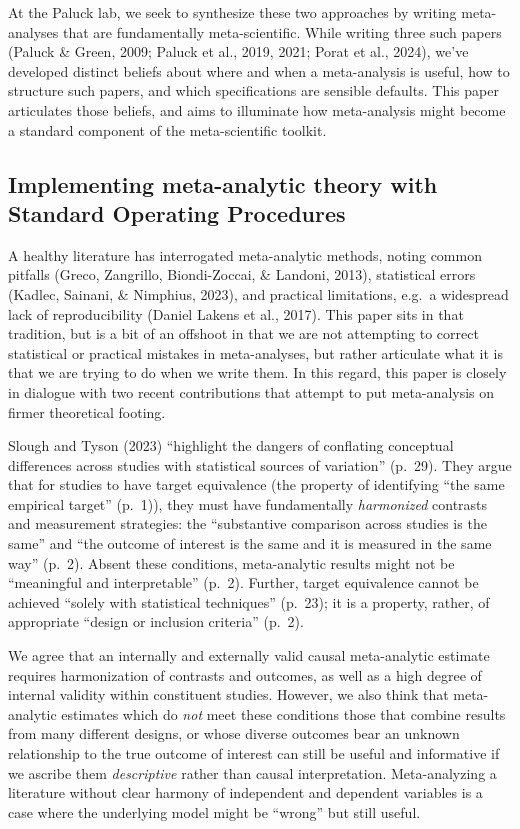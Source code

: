 \documentclass[
  ,jou]{apa6}
\begin{document}
At the Paluck lab, we seek to synthesize these two approaches by writing meta-analyses that are fundamentally meta-scientific. While writing three such papers (Paluck \& Green, 2009; Paluck et al., 2019, 2021; Porat et al., 2024), we've developed distinct beliefs about where and when a meta-analysis is useful, how to structure such papers, and which specifications are sensible defaults. This paper articulates those beliefs, and aims to illuminate how meta-analysis might become a standard component of the meta-scientific toolkit.

\subsection{Implementing meta-analytic theory with Standard Operating Procedures}\label{implementing-meta-analytic-theory-with-standard-operating-procedures}

A healthy literature has interrogated meta-analytic methods, noting common pitfalls (Greco, Zangrillo, Biondi-Zoccai, \& Landoni, 2013), statistical errors (Kadlec, Sainani, \& Nimphius, 2023), and practical limitations, e.g.~a widespread lack of reproducibility (Daniel Lakens et al., 2017). This paper sits in that tradition, but is a bit of an offshoot in that we are not attempting to correct statistical or practical mistakes in meta-analyses, but rather articulate what it is that we are trying to do when we write them. In this regard, this paper is closely in dialogue with two recent contributions that attempt to put meta-analysis on firmer theoretical footing.

Slough and Tyson (2023) ``highlight the dangers of conflating conceptual differences across studies with statistical sources of variation'' (p.~29). They argue that for studies to have target equivalence (the property of identifying ``the same empirical target'' (p.~1)), they must have fundamentally \emph{harmonized} contrasts and measurement strategies: the ``substantive comparison across studies is the same'' and ``the outcome of interest is the same and it is measured in the same way'' (p.~2). Absent these conditions, meta-analytic results might not be ``meaningful and interpretable'' (p.~2). Further, target equivalence cannot be achieved ``solely with statistical techniques'' (p.~23); it is a property, rather, of appropriate ``design or inclusion criteria'' (p.~2).

We agree that an internally and externally valid causal meta-analytic estimate requires harmonization of contrasts and outcomes, as well as a high degree of internal validity within constituent studies. However, we also think that meta-analytic estimates which do \emph{not} meet these conditions \textemdash those that combine results from many different designs, or whose diverse outcomes bear an unknown relationship to the true outcome of interest \textemdash can still be useful and informative if we ascribe them \emph{descriptive} rather than causal interpretation. Meta-analyzing a literature without clear harmony of independent and dependent variables is a case where the underlying model might be ``wrong'' but still useful.
\end{document}
